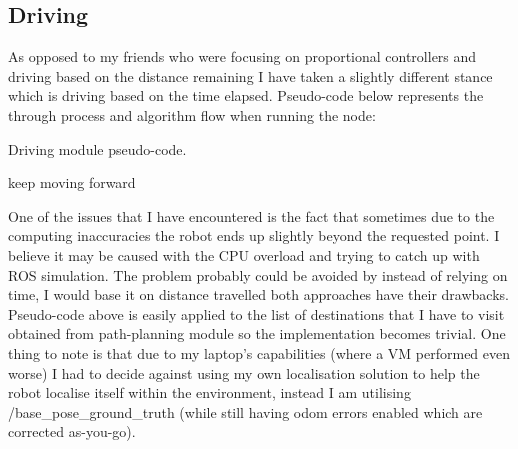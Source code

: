 \documentclass[a4paper]{article}
\begin{document}
\subsection{Driving}
As opposed to my friends who were focusing on proportional controllers and driving based on the distance remaining I have taken a slightly different stance which is driving based on the time elapsed. Pseudo-code below represents the through process and algorithm flow when running the node:
\begin{algorithm}[H]
    \caption{Driving module pseudo-code.}
    \begin{algorithmic}[1]
            \State keep moving forward\;
        \EndWhile
    \end{algorithmic}
\end{algorithm}
One of the issues that I have encountered is the fact that sometimes due to the computing inaccuracies the robot ends up slightly beyond the requested point. I believe it may be caused with the CPU overload and trying to catch up with ROS simulation. The problem probably could be avoided by instead of relying on time, I would base it on distance travelled \textendash{} both approaches have their drawbacks. Pseudo-code above is easily applied to the list of destinations that I have to visit obtained from path-planning module so the implementation becomes trivial. One thing to note is that due to my laptop's capabilities (where a VM performed even worse) I had to decide against using my own localisation solution to help the robot localise itself within the environment, instead I am utilising /base\_pose\_ground\_truth (while still having odom errors enabled which are corrected as-you-go).
\end{document}
